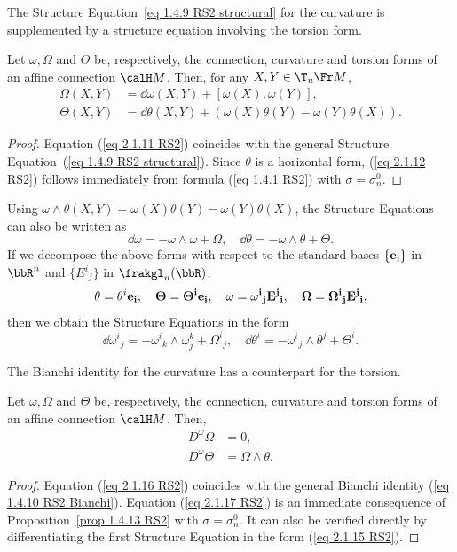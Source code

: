 The Structure Equation~\ref{eq 1.4.9 RS2 structural} for the curvature is supplemented by a structure equation involving the torsion form.

\begin{prop}\label{prop 2.1.11 RS2}
    Let $\omega,\Omega$ and $\Theta$ be, respectively, the connection, curvature and torsion forms of an affine connection $\calH M$. Then, for any $X,Y\in \T_u \Fr M$,
    \begin{align}
        \Omega(X,Y)&= \dd\omega(X,Y)+[\omega(X),\omega(Y)],\label{eq 2.1.11 RS2}\\
        \Theta(X,Y)&= \dd\theta(X,Y)+(\omega(X)\theta(Y)-\omega(Y)\theta(X)).\label{eq 2.1.12 RS2}
    \end{align}
\end{prop}
\begin{proof}
    Equation (\ref{eq 2.1.11 RS2}) coincides with the general Structure Equation~(\ref{eq 1.4.9 RS2 structural}). Since $\theta$ is a horizontal form, (\ref{eq 2.1.12 RS2}) follows immediately from formula (\ref{eq 1.4.1 RS2}) with $\sigma=\sigma_n^0$.
\end{proof}

\begin{rem}
    Using $\omega\wedge\theta(X,Y)=\omega(X)\theta(Y)-\omega(Y)\theta(X)$, the Structure Equations can also be written as
    \[\dd\omega=-\omega\wedge\omega+\Omega,\quad \dd\theta=-\omega\wedge\theta+\Theta.\]
    If we decompose the above forms with respect to the standard bases $\{\bf{e}_i\}$ in $\bbR^n$ and $\{E^i{}_j\}$ in $\frakgl_n(\bbR)$,
    \[\theta=\theta^i\bf{e}_i,\quad \Theta=\Theta^i\bf{e}_i,\quad \omega=\omega^i{}_j E^j{}_i,\quad \Omega=\Omega^i{}_j E^j{}_i,\label{eq 2.1.14 RS2}\]
    then we obtain the Structure Equations in the form
    \[\dd\omega^i{}_j=-\omega^i{}_k\wedge \omega^k_j+\Omega^i{}_j,\quad \dd\theta^i=-\omega^i{}_j\wedge \theta^j+\Theta^i.\label{eq 2.1.15 RS2}\]
\end{rem}

The Bianchi identity for the curvature has a counterpart for the torsion.

\begin{prop}\label{prop 2.1.13 RS2}
    Let $\omega,\Omega$ and $\Theta$ be, respectively, the connection, curvature and torsion forms of an affine connection $\calH M$. Then,
    \begin{align}
        D^\omega\Omega&=0,\label{eq 2.1.16 RS2}\\
        D^\omega\Theta&=\Omega\wedge\theta.\label{eq 2.1.17 RS2}
    \end{align}
\end{prop}
\begin{proof}
    Equation (\ref{eq 2.1.16 RS2}) coincides with the general Bianchi identity (\ref{eq 1.4.10 RS2 Bianchi}). Equation (\ref{eq 2.1.17 RS2}) is an immediate consequence of Proposition~\ref{prop 1.4.13 RS2} with $\sigma=\sigma_n^0$. It can also be verified directly by differentiating the first Structure Equation in the form (\ref{eq 2.1.15 RS2}).
\end{proof}


